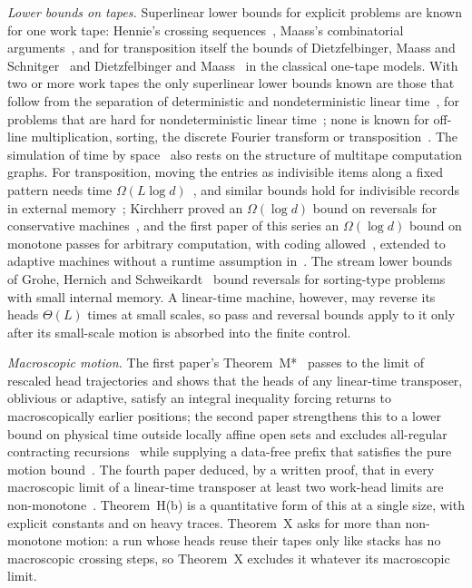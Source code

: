 \emph{Lower bounds on tapes.} Superlinear lower bounds for explicit problems are known for one work tape: Hennie's crossing
sequences~\cite{Hennie1965}, Maass's combinatorial arguments~\cite{Maass1985}, and for transposition itself the bounds of
Dietzfelbinger, Maass and Schnitger~\cite{DMS1991} and Dietzfelbinger and Maass~\cite{DietzfelbingerMaass1993} in the classical one-tape
models. With two or more work tapes the only superlinear lower bounds known are those that follow from the separation of deterministic
and nondeterministic linear time~\cite{PPST1983}, for problems that are hard for nondeterministic linear time~\cite{Grandjean1988}; none is
known for off-line multiplication, sorting, the discrete Fourier transform or transposition~\cite[\S1.4]{HvdH2025}. The simulation of time
by space~\cite{HPV1977} also rests on the structure of multitape computation graphs. For transposition, moving the entries as indivisible
items along a fixed pattern needs time $\Omega(L\log d)$~\cite{Stoss1973}, and similar bounds hold for indivisible records in external
memory~\cite{AggarwalVitter1988}; Kirchherr proved an $\Omega(\log d)$ bound on reversals for conservative machines~\cite{Kirchherr1988}, and
the first paper of this series an $\Omega(\log d)$ bound on monotone passes for arbitrary computation, with coding
allowed~\cite[Theorems~P and~P$'$]{FirstPaper2026}, extended to adaptive machines without a runtime assumption
in~\cite{PassesMemo2026}. The stream lower bounds of Grohe, Hernich and Schweikardt~\cite{GroheSchweikardt2005,GHS2009} bound reversals
for sorting-type problems with small internal memory. A linear-time machine, however, may reverse its heads $\Theta(L)$ times at small
scales, so pass and reversal bounds apply to it only after its small-scale motion is absorbed into the finite control.

\emph{Macroscopic motion.} The first paper's Theorem~M*~\cite[Theorems~7.8 and~7.9]{FirstPaper2026} passes to the limit of rescaled head
trajectories and shows that the heads of any linear-time transposer, oblivious or adaptive, satisfy an integral inequality forcing
returns to macroscopically earlier positions; the second paper strengthens this to a lower bound on physical time outside locally affine
open sets and excludes all-regular contracting recursions~\cite[Theorems~6.3 and~7.5]{SecondPaper2026} while supplying a data-free prefix
that satisfies the pure motion bound~\cite[Theorem~8.1]{SecondPaper2026}. The fourth paper deduced, by a written proof, that in every macroscopic limit of a linear-time
transposer at least two work-head limits are non-monotone~\cite[Corollaries~3.18 and~3.24]{FourthPaper2026}. Theorem~H(b) is a
quantitative form of this at a single size, with explicit constants and on heavy traces. Theorem~X asks for more than non-monotone motion: a
run whose heads reuse their tapes only like stacks has no macroscopic crossing steps, so Theorem~X excludes it whatever its macroscopic limit.


